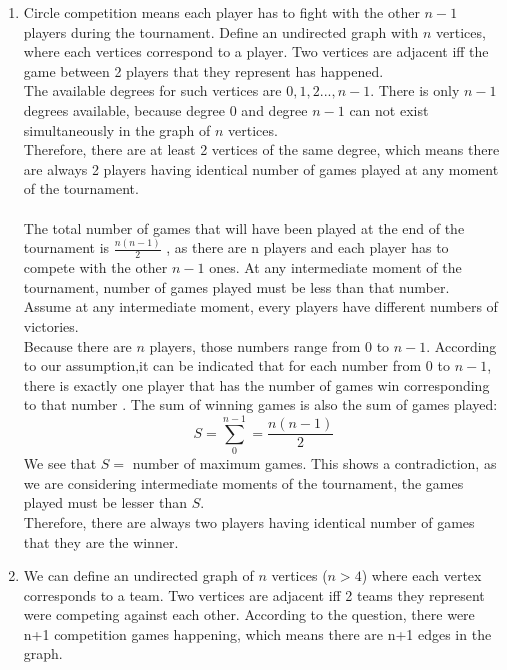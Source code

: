 \documentclass[a4paper]{article}
\begin{document}
	\begin{enumerate}
		\item Circle competition means each player has to fight with the other $n-1$ players during the tournament. Define an undirected graph with $n$ vertices, where each vertices correspond to a player. Two vertices are adjacent iff the game between 2 players that they represent has happened. \\
		      The available degrees for such vertices are $0,1,2...,n-1$. There is only $n-1$ degrees available, because degree 0 and degree $n-1$ can not exist simultaneously in the graph of $n$ vertices. \\
		      Therefore, there are at least 2 vertices of the same degree, which means there are always 2 players having identical number of games played at any moment of the tournament. \\ \\
		      The total number of games that will have been played at the end of the tournament is $\frac{n(n-1)}{2}$ , as there are n players and each player has to compete with the other $n-1$ ones. At any intermediate moment of the tournament, number of games played must be less than that number. \\
		      Assume at any intermediate moment, every players have different numbers of victories.\\
		      Because there are $n$ players, those numbers range from 0 to $n-1$. According to our assumption,it can be indicated that for each number from 0 to $n-1$, there is exactly one player that has the number of games win corresponding to that number . The sum of winning games is also the sum of games played:
		      \begin{equation*}
			      S = \sum_{0}^{n-1} = \frac{n(n-1)}{2}
		      \end{equation*}
		      We see that $S =$ number of maximum games. This shows a contradiction, as we are considering intermediate moments of the tournament, the games played must be lesser than $S$. \\
		      Therefore, there are always two players having identical number of games that they are the winner.
		\item We can define an undirected graph of $n$ vertices ($n > 4$) where each vertex corresponds to a team. Two vertices are adjacent iff 2 teams they represent were competing against each other. According to the question, there were n+1 competition games happening, which means there are n+1 edges in the graph. \\

\end{enumerate}
\end{document}
